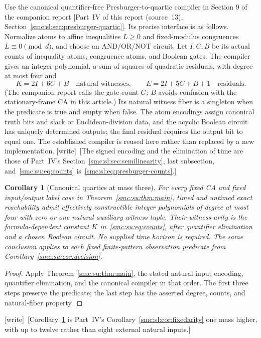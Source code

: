 \documentclass[11pt,letterpaper]{article}
\numberwithin{equation}{section}
\newtheorem{corollary}[theorem]{Corollary}
\theoremstyle{definition}
\theoremstyle{remark}
\newcommand{\wtag}{\textup{[write]}}
\begin{document}
Use the canonical quantifier-free Presburger-to-quartic compiler in
Section 9 of the companion report \textup{[Part~IV of this report (source~13), Section~\ref{smc:sl:sec:presburger-quartic}]}. Its precise interface is as
follows. Normalize atoms to affine inequalities $L\ge0$ and fixed-modulus
congruences $L\equiv0\pmod d$, and choose an AND/OR/NOT circuit. Let $I,C,B$
be its actual counts of inequality atoms, congruence atoms, and Boolean gates.
The compiler gives an integer polynomial, a sum of squares of quadratic
residuals, with degree at most four and
\begin{equation}
 K=2I+6C+B\quad\text{natural witnesses},\qquad
 E=2I+5C+B+1\quad\text{residuals}.                 \label{smc:su:eq:counts}
\end{equation}
(The companion report calls the gate count $G$; $B$ avoids confusion with the
stationary-frame CA in this article.) Its natural witness fiber is a singleton
when the predicate is true and empty when false. The atom encodings assign
canonical truth bits and slack or Euclidean-division data, and the acyclic
Boolean circuit has uniquely determined outputs; the final residual requires
the output bit to equal one. The established compiler is reused here rather
than replaced by a new implementation.
\wtag\ [The signed encoding and the elimination of time are those of Part~IV's Section~\ref{smc:sl:sec:semilinearity}, last subsection, and~\eqref{smc:su:eq:counts} is~\eqref{smc:sl:eq:presburger-counts}.]

\begin{corollary}[Canonical quartics at mass three]\label{smc:su:cor:quartic}
For every fixed CA and fixed input/output label case in
Theorem~\ref{smc:su:thm:main}, timed and untimed exact reachability admit effectively
constructible integer polynomials of degree at most four with zero or one
natural auxiliary witness tuple. Their witness arity is the formula-dependent
constant $K$ in~\eqref{smc:su:eq:counts}, after quantifier elimination and a chosen Boolean circuit.
No supplied time horizon is required. The same conclusion applies to each
fixed finite-pattern observation predicate from Corollary~\ref{smc:su:cor:decision}.
\end{corollary}
\begin{proof}
Apply Theorem~\ref{smc:su:thm:main}, the stated natural input encoding, quantifier
elimination, and the canonical compiler in that order. The first three steps
preserve the predicate; the last step has the asserted degree, counts, and
natural-fiber property.
\end{proof}
\wtag\ [Corollary~\ref{smc:su:cor:quartic} is Part~IV's Corollary~\ref{smc:sl:cor:fixedarity} one mass higher, with up to twelve rather than eight external natural inputs.]
\end{document}
